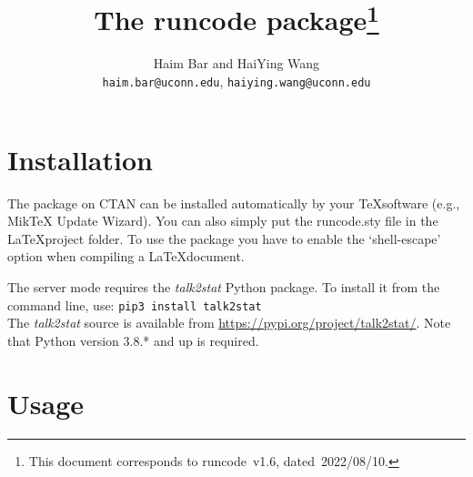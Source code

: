 \documentclass{ltxdoc}
\begin{document}
    \title{The \textsf{runcode} package\thanks{This document  corresponds to \textsf{runcode}~v1.6, dated~2022/08/10.}}
    \author{Haim Bar and HaiYing Wang \\ \texttt{haim.bar@uconn.edu}, \texttt{haiying.wang@uconn.edu}}
    \maketitle


\section{Installation}
The package on CTAN can be installed automatically by your \TeX\space software (e.g., MikTeX Update Wizard). You can also simply put the runcode.sty file in the \LaTeX\space project folder. To use the package you have to enable the `shell-escape' option when compiling a \LaTeX\space document.
	
The server mode requires the \textit{talk2stat} Python package. To install it from the command line, use:
\verb|pip3 install talk2stat|\\
The \textit{talk2stat} source is available from \url{https://pypi.org/project/talk2stat/}.
Note that Python version 3.8.* and up is required.

\section{Usage}
\end{document}
